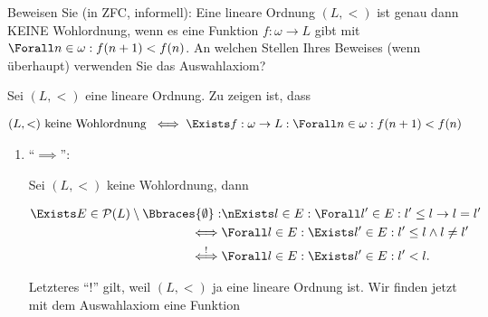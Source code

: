 
\begin{exercise}[286]

Beweisen Sie (in ZFC, informell):
Eine lineare Ordnung $(L, <)$ ist genau dann KEINE Wohlordnung, wenn es eine Funktion $f: \omega \to L$ gibt mit $\Forall n \in \omega: f(n + 1) < f(n)$.
An welchen Stellen Ihres Beweises (wenn überhaupt) verwenden Sie das Auswahlaxiom?

\end{exercise}


\begin{solution}

Sei $(L, <)$ eine lineare Ordnung.
Zu zeigen ist, dass

\begin{align*}
    (L, <) ~\text{keine Wohlordnung}~
    \iff
    \Exists f: \omega \to L:
        \Forall n \in \omega:
            f(n + 1) < f(n)
\end{align*}

\begin{enumerate}[label = \texttt{ad}]

    \item \enquote{$\implies$}:

    Sei $(L, <)$ keine Wohlordnung, dann

    \begin{align} \label{eq:keine_Wohlordnung}
        \begin{split}
            \Exists E \in \mathcal{P}(L) \setminus \Bbraces{\emptyset}:
                & \nExists l \in E:
                    \Forall l^\prime \in E:
                        l^\prime \leq l \to l = l^\prime \\
                \iff
                & \Forall l \in E:
                    \Exists l^\prime \in E:
                        l^\prime \leq l \land l \neq l^\prime \\
                \stackrel{!}{\iff}
                & \Forall l \in E:
                    \Exists l^\prime \in E:
                        l^\prime < l.
        \end{split}
    \end{align}

    Letzteres \enquote{!} gilt, weil $(L, <)$ ja eine lineare Ordnung ist.
    Wir finden jetzt mit dem Auswahlaxiom eine Funktion


\end{enumerate}
\end{solution}
